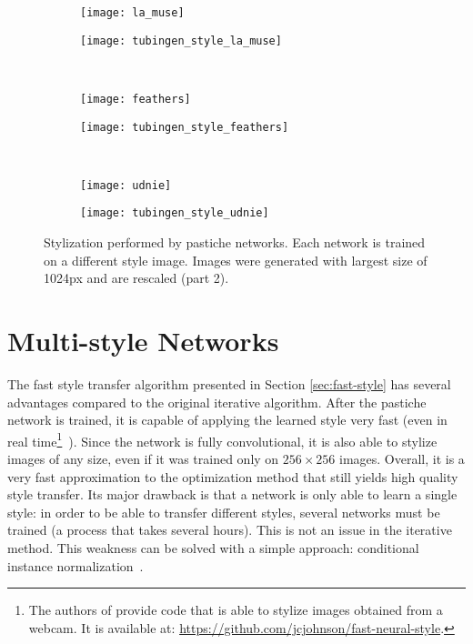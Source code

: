 \begin{figure}
	\centering
	\begin{subfigure}[t]{0.25\textwidth}
		\vskip 0pt
		\texttt{[image: la\_muse]}
	\end{subfigure}
	\begin{subfigure}[t]{0.7\textwidth}
		\vskip 0pt
		\texttt{[image: tubingen\_style\_la\_muse]}
	\end{subfigure}\\
	\begin{subfigure}[t]{0.25\textwidth}
		\vskip 0pt
		\texttt{[image: feathers]}
	\end{subfigure}
	\begin{subfigure}[t]{0.7\textwidth}
		\vskip 0pt
		\texttt{[image: tubingen\_style\_feathers]}
	\end{subfigure}\\
	\begin{subfigure}[t]{0.25\textwidth}
		\vskip 0pt
		\texttt{[image: udnie]}
	\end{subfigure}
	\begin{subfigure}[t]{0.7\textwidth}
		\vskip 0pt
		\texttt{[image: tubingen\_style\_udnie]}
	\end{subfigure}
	\caption[Stylization performed by pastiche networks.]{Stylization performed by pastiche networks. Each network is trained on a different style image. Images were generated with largest size of 1024px and are rescaled (part 2).\label{fig:fast-style4-6}}
\end{figure}
\section{Multi-style Networks}
The fast style transfer algorithm presented in Section \ref{sec:fast-style} has several advantages compared to the original iterative algorithm. After the pastiche network is trained, it is capable of applying the learned style very fast (even in real time\footnote{The authors of \cite{johnson2016perceptual} provide code that is able to stylize images obtained from a webcam. It is available at: \url{https://github.com/jcjohnson/fast-neural-style}.}~\cite{johnson2016perceptual}). Since the network is fully convolutional, it is also able to stylize images of any size, even if it was trained only on $256\times 256$ images. Overall, it is a very fast approximation to the optimization method that still yields high quality style transfer. Its major drawback is that a network is only able to learn a single style: in order to be able to transfer different styles, several networks must be trained (a process that takes several hours). This is not an issue in the iterative method. This weakness can be solved with a simple approach: conditional instance normalization~\cite{dumoulin2016learned}.

